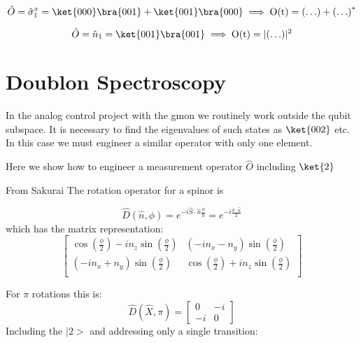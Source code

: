 \begin{equation}
    \hat{O}=\hat{\sigma}^x_1 = \ket{000}\bra{001} + \ket{001}\bra{000} \implies \textrm{O(t)} = \left( \mathellipsis \right) + \left(  \mathellipsis  \right)^{*}
\end{equation}

\begin{equation}
    \hat{O}=\hat{n}_1 = \ket{001}\bra{001} \implies \textrm{O(t)} = \lvert \left( \mathellipsis \right) \rvert^{2}
\end{equation}









\section{Doublon Spectroscopy}
In the analog control project with the gmon we routinely work outside the qubit subspace.  It is necessary to find the eigenvalues of such states as $\ket{002}$ etc.
In this case we must engineer a similar operator with only one element.

Here we show how to engineer a measurement operator $\hat{O}$ including $\ket{2}$

From Sakurai The rotation operator for a spinor is

\begin{equation}
    \hat{D}(\hat{n},\phi)=e^{-i \hat{S} \cdot \hat{n} \frac{\phi}{\hbar}}=e^{-i \frac{\hat{\sigma} \cdot \hat{n}}{2} }
\end{equation}
which has the matrix representation:
\begin{equation}
    \begin{bmatrix}
        \cos \left( \frac{\phi}{2} \right) - i n_z \sin \left( {\frac{\phi}{2}} \right) & \left( -i n_x - n_y \right) \sin \left( \frac{\phi}{2} \right)   \\
        \left( -i n_x + n_y \right) \sin \left( \frac{\phi}{2} \right) & \cos \left( \frac{\phi}{2} \right) + i n_z \sin \left( {\frac{\phi}{2}} \right)   \\
    \end{bmatrix}
\end{equation}

For $\pi$ rotations this is:
\begin{equation}
    \hat{D}(\hat{X}, \pi)=
    \begin{bmatrix}
        0 & -i \\
        -i & 0
    \end{bmatrix}
\end{equation}
Including the $|2>$ and addressing only a single transition:

